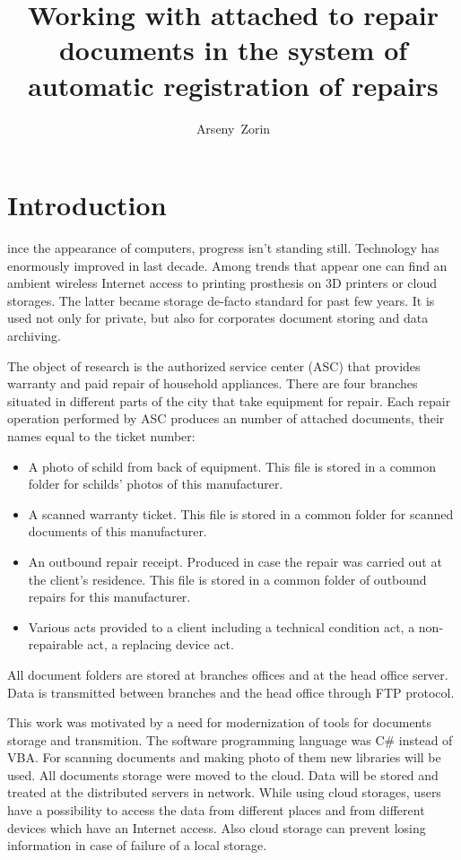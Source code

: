 \documentclass[12pt,journal,compsoc]{D:/Магистратура/English/bare_conf/IEEEtran}
\begin{document}
\title{Working with attached to repair documents in the system of automatic registration of repairs}

\author{Arseny~Zorin}
\maketitle

\IEEEpeerreviewmaketitle



\section{Introduction}
ince the appearance of computers, progress isn't standing still. Technology has enormously improved in last decade. Among trends that appear one can find an ambient wireless Internet access to printing prosthesis on 3D printers or cloud storages. The latter became storage de-facto standard for past few years. It is used not only for private, but also for corporates document storing and data archiving.

The object of research is the authorized service center (ASC) that provides warranty and paid repair of household appliances. There are four branches situated in different parts of the city that take equipment for repair. Each repair operation performed by ASC produces an number of attached documents, their names equal to the ticket number:
\begin{itemize}
\item A photo of schild from back of equipment. This file is stored in a common folder for schilds' photos of this manufacturer.
\item A scanned warranty ticket. This file is stored in a common folder for scanned documents of this manufacturer.
\item An outbound repair receipt. Produced in case the repair was carried out at the client's residence. This file is stored in a common folder of outbound repairs for this manufacturer.
\item Various acts provided to a client including a technical condition act, a non-repairable act, a replacing device act.
\end{itemize}

All document folders are stored at branches offices and at the head office server. Data is transmitted between branches and the head office through FTP protocol.

This work was motivated by a need for modernization of tools for documents storage and transmition. The software programming language was C\# instead of VBA. For scanning documents and making photo of them new libraries will be used. All documents storage were moved to the cloud. Data will be stored and treated at the distributed servers in network. While using cloud storages, users have a possibility to access the data from different places and from different devices which have an Internet access. Also cloud storage can prevent losing information in case of failure of a local storage.
\end{document}
